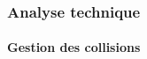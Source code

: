 \begin{frame}

	\frametitle{Analyse technique}
	\framesubtitle{Gestion des collisions}

\end{frame}
